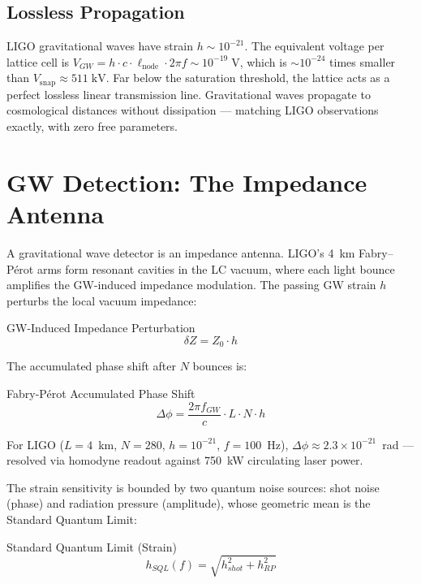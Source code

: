 \subsection{Lossless Propagation}

LIGO gravitational waves have strain
$h \sim 10^{-21}$.  The equivalent voltage per lattice cell is
$V_{GW} = h \cdot c \cdot \ell_{\text{node}} \cdot 2\pi f
\sim 10^{-19}\;\text{V}$, which is $\sim 10^{-24}$ times smaller than
$V_{\text{snap}} \approx 511\;\text{kV}$.  Far below the saturation
threshold, the lattice acts as a perfect lossless linear transmission
line.  Gravitational waves propagate to cosmological distances without
dissipation --- matching LIGO observations exactly, with zero free
parameters.


\section{GW Detection: The Impedance Antenna}
\label{sec:gw_detection}

A gravitational wave detector is an impedance antenna.  LIGO's 4~km
Fabry--P\'erot arms form resonant cavities in the LC vacuum, where
each light bounce amplifies the GW-induced impedance modulation.
The passing GW strain $h$ perturbs the local vacuum impedance:
\begin{resultbox}{GW-Induced Impedance Perturbation}
\begin{equation}
    \delta Z = Z_0 \cdot h
\end{equation}
\end{resultbox}
The accumulated phase shift after $N$ bounces is:
\begin{resultbox}{Fabry-P\'erot Accumulated Phase Shift}
\begin{equation}
    \Delta\phi = \frac{2\pi f_{GW}}{c} \cdot L \cdot N \cdot h
\end{equation}
\end{resultbox}
For LIGO ($L=4$~km, $N=280$, $h=10^{-21}$, $f=100$~Hz),
$\Delta\phi \approx 2.3 \times 10^{-21}$~rad --- resolved via
homodyne readout against 750~kW circulating laser power.

The strain sensitivity is bounded by two quantum noise sources:
shot noise (phase) and radiation pressure (amplitude), whose
geometric mean is the Standard Quantum Limit:
\begin{resultbox}{Standard Quantum Limit (Strain)}
\begin{equation}
    h_{SQL}(f) = \sqrt{h_{shot}^2 + h_{RP}^2}
\end{equation}
\end{resultbox}


